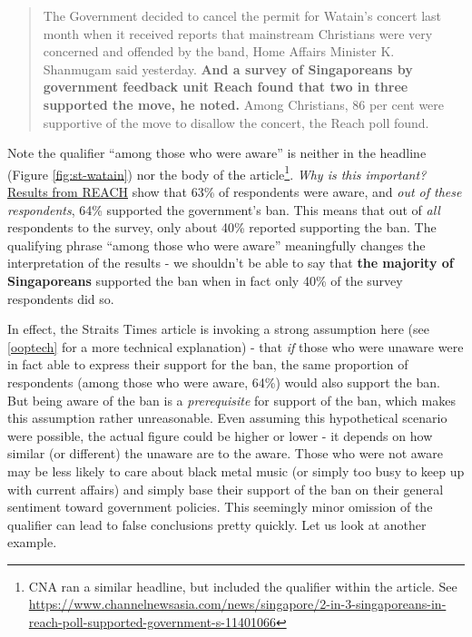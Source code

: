 \documentclass[
  openany]{book}
\begin{document}
\begin{quote}
The Government decided to cancel the permit for Watain's concert last month when it received reports that mainstream Christians were very concerned and offended by the band, Home Affairs Minister K. Shanmugam said yesterday. \textbf{And a survey of Singaporeans by government feedback unit Reach found that two in three supported the move, he noted.} Among Christians, 86 per cent were supportive of the move to disallow the concert, the Reach poll found.
\end{quote}

Note the qualifier ``among those who were aware'' is neither in the headline (Figure \ref{fig:st-watain}) nor the body of the article\footnote{CNA ran a similar headline, but included the qualifier within the article. See \url{https://www.channelnewsasia.com/news/singapore/2-in-3-singaporeans-in-reach-poll-supported-government-s-11401066}}. \emph{Why is this important?} \href{https://www.reach.gov.sg/~/media/2019/press-release/findings-of-poll-on-watain-concert--1-april-2019.pdf}{Results from REACH} show that 63\% of respondents were aware, and \emph{out of these respondents}, 64\% supported the government's ban. This means that out of \emph{all} respondents to the survey, only about 40\% reported supporting the ban. The qualifying phrase ``among those who were aware'' meaningfully changes the interpretation of the results - we shouldn't be able to say that \textbf{the majority of Singaporeans} supported the ban when in fact only 40\% of the survey respondents did so.

In effect, the Straits Times article is invoking a strong assumption here (see \ref{ooptech} for a more technical explanation) - that \emph{if} those who were unaware were in fact able to express their support for the ban, the same proportion of respondents (among those who were aware, 64\%) would also support the ban. But being aware of the ban is a \emph{prerequisite} for support of the ban, which makes this assumption rather unreasonable. Even assuming this hypothetical scenario were possible, the actual figure could be higher or lower - it depends on how similar (or different) the unaware are to the aware. Those who were not aware may be less likely to care about black metal music (or simply too busy to keep up with current affairs) and simply base their support of the ban on their general sentiment toward government policies. This seemingly minor omission of the qualifier can lead to false conclusions pretty quickly. Let us look at another example.
\end{document}
